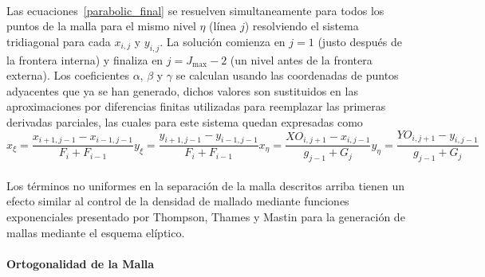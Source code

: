 \documentclass[letterpaper, openright, 12pt]{book}
\begin{document}
    \paragraph*{}
    Las ecuaciones~\ref{parabolic_final} se resuelven simultaneamente para
    todos los puntos de la malla para el mismo nivel $\eta$ (línea $j$)
    resolviendo el sistema tridiagonal para cada $x_{i, j}$ y $y_{i, j}$. La
    solución comienza en $j = 1$ (justo después de la frontera interna) y
    finaliza en $j = J_{\max} - 2$ (un nivel antes de la frontera externa). Los
    coeficientes $\alpha$, $\beta$ y $\gamma$ se calculan usando las
    coordenadas de puntos adyacentes que ya se han generado, dichos valores
    son sustituidos en las aproximaciones por diferencias finitas utilizadas
    para reemplazar las primeras derivadas parciales, las cuales para este
    sistema quedan expresadas como\\
    \begin{subequations}
        \begin{equation}
            x_\xi = \frac{x_{i+1, j-1} - x_{i-1, j-1}}{F_i + F_{i-1}}
        \end{equation}
        \begin{equation}
            y_\xi = \frac{y_{i+1, j-1} - y_{i-1, j-1}}{F_i + F_{i-1}}
        \end{equation}
        \begin{equation}
            x_\eta = \frac{XO_{i, j+1} - x_{i, j-1}}{g_{j-1} + G_j}
        \end{equation}
        \begin{equation}
            y_\eta = \frac{YO_{i, j+1} - y_{i, j-1}}{g_{j-1} + G_j}
        \end{equation}
    \end{subequations}

    \paragraph*{}
    Los términos no uniformes en la separación de la malla descritos arriba
    tienen un efecto similar al control de la densidad de mallado mediante
    funciones exponenciales presentado por Thompson, Thames y Mastin
    \cite{thompson1974automatic} para la generación de mallas mediante el
    esquema elíptico.

    \paragraph*{Ortogonalidad de la Malla}
\end{document}
